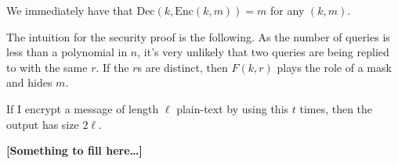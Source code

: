 \documentclass[./main]{subfiles}
\begin{document}
  We immediately have that $\mathrm{Dec}(k, \mathrm{Enc}(k, m)) = m$ for any $(k, m)$.

  The intuition for the security proof is the following.
  As the number of queries is less than a polynomial in $n$, it's very unlikely that two queries are being replied to with the same $r$.
  If the $r$s are distinct, then $F(k, r)$ plays the role of a mask and hides $m$.

  If I encrypt a message of length $\ell$ plain-text by using this $t$ times, then the output has size $2 \ell$.

  \textbf{[Something to fill here\ldots]}
\end{document}
